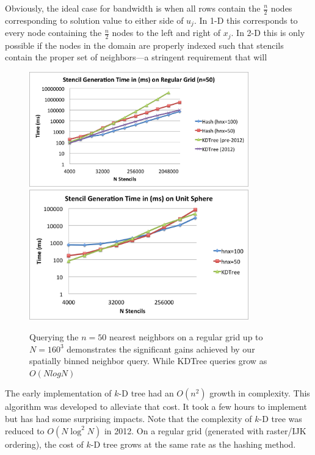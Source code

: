 \documentclass{report}
\begin{document}
Obviously, the ideal case for bandwidth is when all rows contain the $\frac{n}{2}$ nodes corresponding to solution value to either side of $u_j$. In 1-D this corresponds to every node containing the $\frac{n}{2}$ nodes to the left and right of $x_j$. In 2-D this is only possible if the nodes in the domain are properly indexed such that stencils contain the proper set of neighbors---a stringent requirement that will 


\begin{figure}
\centering
\includegraphics[width=9.5cm]{../figures/stencils/kdtree_old_reg_subsets_4m_stencil_gen_time.png}
\includegraphics[width=9.5cm]{../figures/stencils/sphere_subsets_1m_stencil_gen_time.png}
\caption{Querying the $n=50$ nearest neighbors on a regular grid up to $N=160^3$ demonstrates the significant gains achieved by our spatially binned neighbor query. While KDTree queries grow as $O(N log N)$}
\label{fig:hash_results}
\end{figure}


The early implementation of $k$-D tree had an $O(n^2)$ growth in complexity. This algorithm was developed to alleviate that cost. It took a few hours to implement but has had some surprising impacts. Note that the complexity of $k$-D tree was reduced to $O(N \log^2 N)$ in 2012. On a regular grid (generated with raster/IJK ordering), the cost of $k$-D tree grows at the same rate as the hashing method. 
\end{document}
